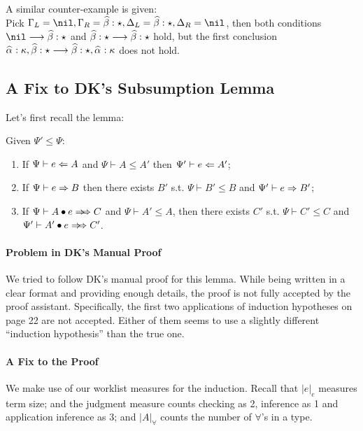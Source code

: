 \begin{itemize}
        A similar counter-example is given:\\
        Pick $\Gm_L = \nil, \Gm_R = \bt:\star, \Delta_L = \bt:\star, \Delta_R = \nil$, then both conditions
        $\nil\longrightarrow \bt:\star$ and $\bt:\star\longrightarrow \bt:\star$ hold, but the first conclusion
        $\al:\kappa,\bt:\star \longrightarrow \bt:\star,\al:\kappa$ does not hold.
\end{itemize}

\subsection{A Fix to DK's Subsumption Lemma}
\label{appendix:subsumption}

Let's first recall the lemma:
\begin{lemma}[Subsumption]
Given $\Psi' \le \Psi$:
\begin{enumerate}
    \item If $\Psi \vdash e \Leftarrow A$ and $\Psi \vdash A \le A'$ then $\Psi' \vdash e \Leftarrow A'$;
    \item If $\Psi \vdash e \Rightarrow B$ then there exists
        $B'$ s.t. $\Psi \vdash B' \le B$ and $\Psi' \vdash e \Rightarrow B'$;
    \item If $\Psi \vdash \appInf{A}{e}{C}$ and $\Psi \vdash A' \le A$,
        then there exists $C'$ s.t. $\Psi \vdash C' \le C$ and $\Psi' \vdash \appInf{A'}{e}{C'}$.
\end{enumerate}
\end{lemma}

\paragraph{Problem in DK's Manual Proof}
We tried to follow DK's manual proof for this lemma.
While being written in a clear format and providing enough details,
the proof is not fully accepted by the proof assistant.
Specifically, the first two applications of induction hypotheses on page 22 are not accepted.
Either of them seems to use a slightly different ``induction hypothesis'' than the true one.

\paragraph{A Fix to the Proof}
We make use of our worklist measures for the induction.
Recall that $|e|_e$ measures term size;
and the judgment measure counts checking as 2, inference as 1 and application inference as 3;
and $|A|_\forall$ counts the number of $\forall$'s in a type.

